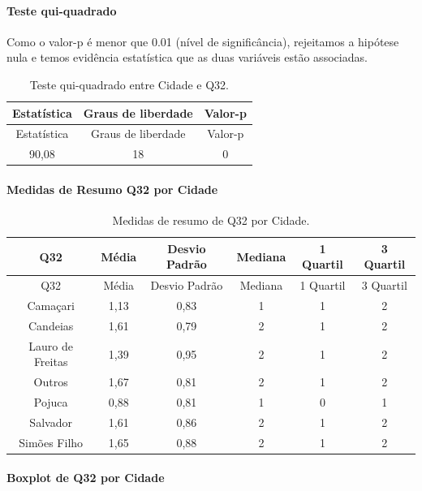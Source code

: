 \documentclass[]{article}
\let\oldparagraph\paragraph
\renewcommand{\paragraph}[1]{\oldparagraph{#1}\mbox{}}
\begin{document}
\hypertarget{teste-qui-quadrado-92}{%
\paragraph{Teste qui-quadrado}\label{teste-qui-quadrado-92}}

Como o valor-p é menor que 0.01 (nível de significância), rejeitamos a hipótese nula e temos evidência estatística que as duas variáveis estão associadas.

\begin{longtable}[]{@{}ccc@{}}
\caption{\label{tab:unnamed-chunk-1077}Teste qui-quadrado entre Cidade e Q32.}\tabularnewline
\toprule
Estatística & Graus de liberdade & Valor-p\tabularnewline
\midrule
\endfirsthead
\toprule
Estatística & Graus de liberdade & Valor-p\tabularnewline
\midrule
\endhead
90,08 & 18 & 0\tabularnewline
\bottomrule
\end{longtable}

\cleardoublepage

\hypertarget{medidas-de-resumo-q32-por-cidade}{%
\paragraph{Medidas de Resumo Q32 por Cidade}\label{medidas-de-resumo-q32-por-cidade}}

\begin{longtable}[]{@{}cccccc@{}}
\caption{\label{tab:unnamed-chunk-1078}Medidas de resumo de Q32 por Cidade.}\tabularnewline
\toprule
Q32 & Média & Desvio Padrão & Mediana & 1 Quartil & 3 Quartil\tabularnewline
\midrule
\endfirsthead
\toprule
Q32 & Média & Desvio Padrão & Mediana & 1 Quartil & 3 Quartil\tabularnewline
\midrule
\endhead
Camaçari & 1,13 & 0,83 & 1 & 1 & 2\tabularnewline
Candeias & 1,61 & 0,79 & 2 & 1 & 2\tabularnewline
Lauro de Freitas & 1,39 & 0,95 & 2 & 1 & 2\tabularnewline
Outros & 1,67 & 0,81 & 2 & 1 & 2\tabularnewline
Pojuca & 0,88 & 0,81 & 1 & 0 & 1\tabularnewline
Salvador & 1,61 & 0,86 & 2 & 1 & 2\tabularnewline
Simões Filho & 1,65 & 0,88 & 2 & 1 & 2\tabularnewline
\bottomrule
\end{longtable}

\hypertarget{boxplot-de-q32-por-cidade}{%
\paragraph{Boxplot de Q32 por Cidade}\label{boxplot-de-q32-por-cidade}}
\end{document}
